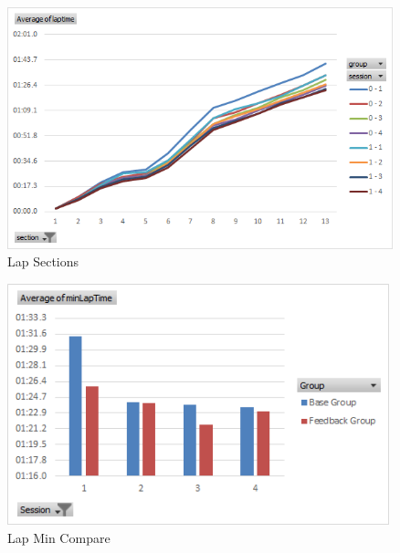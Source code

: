 \begin{figure}[!htb]
	\centering
	\includegraphics[height=7cm]{images/LapSections}
	\caption{Lap Sections}
	\label{fig:LapSections}
\end{figure}

\begin{figure}[!htb]
	\centering
	\includegraphics[height=7cm]{images/LapMinCompare}
	\caption{Lap Min Compare}
	\label{fig:LapMinCompare}
\end{figure}